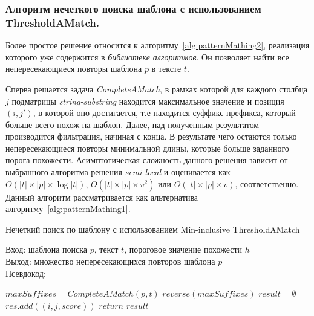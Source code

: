 \subsubsection{Алгоритм нечеткого поиска шаблона с использованием ThresholdAMatch.}
Более простое решение  относится к алгоритму~\ref{alg:patternMathing2}, реализация которого уже содержится в \emph{библиотеке алгоритмов}. 
Он позволяет найти все непересекающиеся повторы шаблона $p$ в тексте $t$.

Сперва решается задача \emph{CompleteAMatch}, в рамках которой для каждого столбца $j$ подматрицы \emph{string-substring} находится максимальное значение и позиция $(i,j')$, в которой оно достигается, т.е находится суффикс префикса, который больше всего похож на шаблон.
Далее, над полученным результатом производится фильтрация, начиная с конца.
В результате чего остаются только непересекающиеся повторы минимальной длины, которые больше заданного порога похожести.
Асимптотическая сложность данного решения зависит от выбранного алгоритма решения \emph{semi-local} и оценивается как  $O(|t| \times |p| \times \log |t|)$, $O(|t| \times |p| \times v^2)$ или $O(|t| \times |p| \times v)$, 
соответственно.
Данный алгоритм рассматривается как альтернатива алгоритму~\ref{alg:patternMathing1}.

\begin{algorithm}[b!]
\caption{Нечеткий поиск по шаблону с использованием Min-inclusive ThresholdAMatch}\label{alg:patternMathing2}
Вход: шаблона поиска $p$, текст $t$, пороговое значение похожести $h$\\
Выход: множество непересекающихся повторов шаблона $p$\\
Псевдокод:
\begin{algorithmic}[1]
\State $maxSuffixes= CompleteAMatch(p,t)$
\State $reverse(maxSuffixes)$
\State $result = \emptyset$
    \State $res.add((i,j,score))$ 
    \EndIf
\EndFor
\State $return$ $result$

\end{algorithmic}
\end{algorithm}


